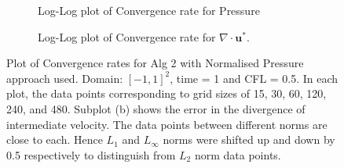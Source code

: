 \begin{figure}[H]
	\centering
	\begin{subfigure}[t]{4.5in}
		\centering
		\caption{Log-Log plot of Convergence rate for Pressure}\label{fig:6.19a}		
	\end{subfigure}
	\quad
	\begin{subfigure}[t]{4.5in}
		\centering
		\caption{Log-Log plot of Convergence rate for $\nabla \cdot \textbf{u}^*$. }\label{fig:6.19b}
	\end{subfigure}
	\caption{Plot of Convergence rates for Alg 2 with Normalised Pressure approach used. Domain: $[-1,1]^2$, time = 1 and CFL = 0.5. In each plot, the data points corresponding to grid sizes of 15, 30, 60, 120, 240, and 480. Subplot (b) shows the error in the divergence of intermediate velocity. The data points between different norms are close to each. Hence $L_1$ and $L_\infty$ norms were shifted up and down by 0.5 respectively to distinguish from $L_2$ norm data points.}\label{fig:6.16}
\end{figure}


